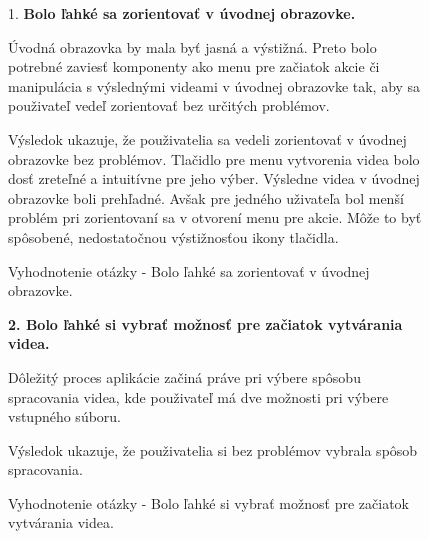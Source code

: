 
\begin{figure}[H]
1. \textbf{Bolo ľahké sa zorientovať
v úvodnej obrazovke.}

Úvodná obrazovka by mala byť jasná a výstižná. Preto bolo potrebné zaviesť komponenty ako menu pre začiatok akcie či manipulácia s výslednými videami v úvodnej obrazovke tak, aby sa použivateľ vedeľ zorientovať bez určitých problémov.

Výsledok ukazuje, že použivatelia sa vedeli zorientovať v úvodnej obrazovke bez problémov. Tlačidlo pre menu vytvorenia videa bolo dosť zreteľné a intuitívne pre jeho výber. Výsledne videa v úvodnej obrazovke boli prehľadné. Avšak pre jedného uživateľa bol menší problém pri zorientovaní sa v otvorení menu pre akcie. Môže to byť spôsobené, nedostatočnou výstižnosťou ikony tlačidla.

\caption{Vyhodnotenie otázky - Bolo ľahké sa zorientovať
v úvodnej obrazovke.}
\end{figure}

\begin{figure}[H]
\textbf{2. Bolo ľahké si vybrať možnosť
pre začiatok vytvárania videa.}

Dôležitý proces aplikácie začiná práve pri výbere spôsobu spracovania videa, kde použivateľ má dve možnosti pri výbere vstupného súboru.

Výsledok ukazuje, že použivatelia si bez problémov vybrala spôsob spracovania.

\caption{Vyhodnotenie otázky - Bolo ľahké si vybrať možnosť
pre začiatok vytvárania videa.}
\end{figure}

